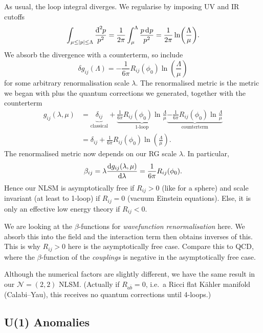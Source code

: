 As usual, the loop integral diverges. We regularise by imposing UV and IR cutoffs
\begin{equation}
  \int_{\mu \leq \abs{p} \leq \Lambda} \frac{\bdd[2]{p}}{p^2} = \frac{1}{2 \pi} \int_{\mu}^{\Lambda} \frac{p \dd[]{p}}{p^2} = \frac{1}{2 \pi}  \ln(\frac{\Lambda}{\mu}).
\end{equation}
We absorb the divergence with a counterterm, so include
\begin{equation}
  \delta g_{ij}(\Lambda) = -\frac{1}{6 \pi} R_{ij}(\phi_0) \ln(\frac{\Lambda}{\mu})
\end{equation}
for some arbitrary renormalisation scale $\lambda$.
The renormalised metric is the metric we began with plus the quantum corrections we generated, together with the counterterm
\begin{align}
  g_{ij}(\lambda, \mu) &= \underbrace{\delta_{ij}}_{\text{classical}} + \underbrace{\frac{1}{6 \pi} R_{ij}(\phi_0) \ln \frac{\Lambda}{\mu}}_{\text{1-loop}} \underbrace{- \frac{1}{6 \pi} R_{ij}(\phi_0) \ln \frac{\Lambda}{\mu}}_{\text{counterterm}} \\
		       &= \delta_{ij} + \frac{1}{6 \pi} R_{ij}(\phi_0) \ln( \frac{\Lambda}{\mu}).
\end{align}
The renormalised metric now depends on our RG scale $\lambda$. In particular, 
\begin{equation}
  \beta_{ij} = \lambda \dv{g_{ij}(\lambda, \mu)}{\lambda} = \frac{1}{6 \pi} R_{ij}(\phi_0).
\end{equation}
Hence our NLSM is asymptotically free if $R_{ij} > 0$ (like for a sphere) and scale invariant (at least to 1-loop) if $R_{ij} = 0$ (vacuum Einstein equations).
Else, it is only an effective low energy theory if $R_{ij} < 0$.
\begin{remark}
  We are looking at the $\beta$-functions for \emph{wavefunction renormalisation} here. We absorb this into the field and the interaction term then obtains inverses of this. This is why $R_{ij} > 0$ here is the asymptotically free case. Compare this to QCD, where the $\beta$-function of the \emph{couplings} is negative in the asymptotically free case.
\end{remark}
Although the numerical factors are slightly different, we have the same result in our $\mathcal{N} = (2,2)$ NLSM.
(Actually if $R_{a \overline{b}{}} = 0$, i.e.~a Ricci flat Kähler manifold (Calabi--Yau), this receives no quantum corrections until 4-loops.)

\subsection{U(1) Anomalies}%
\label{sub:u_1_anomalies}

